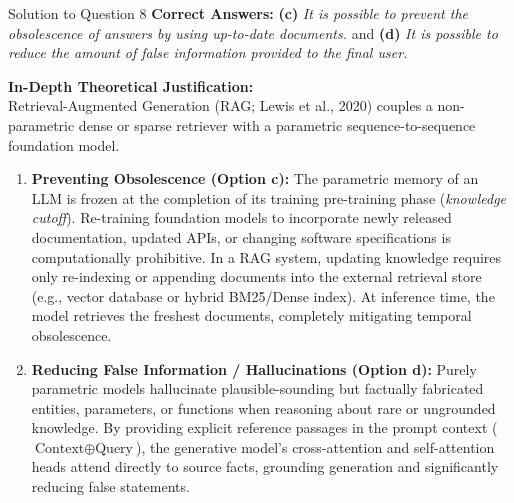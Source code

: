 \documentclass[11pt,a4paper]{article}
\begin{document}
\begin{solutionbox}{Solution to Question 8}
\textbf{Correct Answers:} \textbf{(c)} \textit{It is possible to prevent the obsolescence of answers by using up-to-date documents.} \quad and \quad \textbf{(d)} \textit{It is possible to reduce the amount of false information provided to the final user.}

\medskip
\textbf{In-Depth Theoretical Justification:}\\
Retrieval-Augmented Generation (RAG; Lewis et al., 2020) couples a non-parametric dense or sparse retriever with a parametric sequence-to-sequence foundation model.

\begin{enumerate}[label=\textbf{\arabic*.}]
    \item \textbf{Preventing Obsolescence (Option c):} The parametric memory of an LLM is frozen at the completion of its training pre-training phase (\textit{knowledge cutoff}). Re-training foundation models to incorporate newly released documentation, updated APIs, or changing software specifications is computationally prohibitive. In a RAG system, updating knowledge requires only re-indexing or appending documents into the external retrieval store (e.g., vector database or hybrid BM25/Dense index). At inference time, the model retrieves the freshest documents, completely mitigating temporal obsolescence.
    \item \textbf{Reducing False Information / Hallucinations (Option d):} Purely parametric models hallucinate plausible-sounding but factually fabricated entities, parameters, or functions when reasoning about rare or ungrounded knowledge. By providing explicit reference passages in the prompt context ($\text{Context} \oplus \text{Query}$), the generative model's cross-attention and self-attention heads attend directly to source facts, grounding generation and significantly reducing false statements.
\end{enumerate}


\end{solutionbox}
\end{document}
